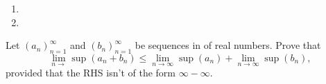 \documentclass[12pt,letterpaper,boxed]{hmcpset}
\begin{document}
\begin{solution}
\begin{enumerate}
        \itemsep0em
        \item 
        \item
    \end{enumerate}
\end{solution}

\begin{problem}[Exercise 4.2]
Let $(a_n)_{n=1}^{\infty}$ and $(b_n)_{n=1}^{\infty}$ be sequences in of real numbers. Prove that $$\lim_{n \rightarrow} \sup(a_n + b_n) \leq \lim_{n \rightarrow \infty} \sup(a_n) + \lim_{n \rightarrow \infty} \sup(b_n),$$ provided that the RHS isn't of the form $\infty - \infty$.
\end{problem}

\begin{solution}

\end{solution}
\end{document}
